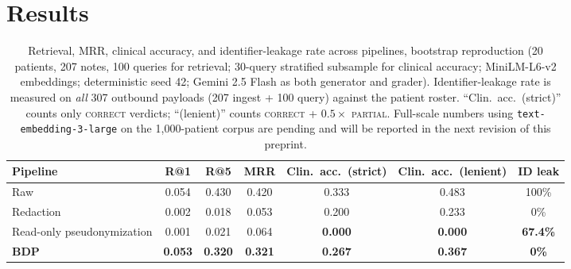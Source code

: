 \documentclass[11pt,a4paper]{article}
\begin{document}
\section{Results}
\label{sec:results}

\begin{table}[t]
\centering
\caption{Retrieval, MRR, clinical accuracy, and identifier-leakage rate
across pipelines, bootstrap reproduction (20 patients, 207 notes, 100
queries for retrieval; 30-query stratified subsample for clinical
accuracy; MiniLM-L6-v2 embeddings; deterministic seed 42; Gemini 2.5 Flash
as both generator and grader). Identifier-leakage rate is measured on
\emph{all} 307 outbound payloads (207 ingest + 100 query) against the
patient roster. ``Clin.\ acc.\ (strict)'' counts only \textsc{correct}
verdicts; ``(lenient)'' counts \textsc{correct} + $0.5 \times$
\textsc{partial}. Full-scale numbers using
\texttt{text-embedding-3-large} on the 1{,}000-patient corpus are pending
and will be reported in the next revision of this preprint.}
\label{tab:main}
\small
\begin{tabular}{lcccccc}
\toprule
Pipeline & R@1 & R@5 & MRR & Clin.\ acc.\ (strict) & Clin.\ acc.\ (lenient) & ID leak \\
\midrule
Raw                       & 0.054 & 0.430 & 0.420 & 0.333 & 0.483 & 100\% \\
Redaction                 & 0.002 & 0.018 & 0.053 & 0.200 & 0.233 & 0\% \\
Read-only pseudonymization & 0.001 & 0.021 & 0.064 & \textbf{0.000} & \textbf{0.000} & \textbf{67.4\%} \\
\textbf{BDP}              & \textbf{0.053} & \textbf{0.320} & \textbf{0.321} & \textbf{0.267} & \textbf{0.367} & \textbf{0\%} \\
\bottomrule
\end{tabular}
\end{table}
\end{document}
